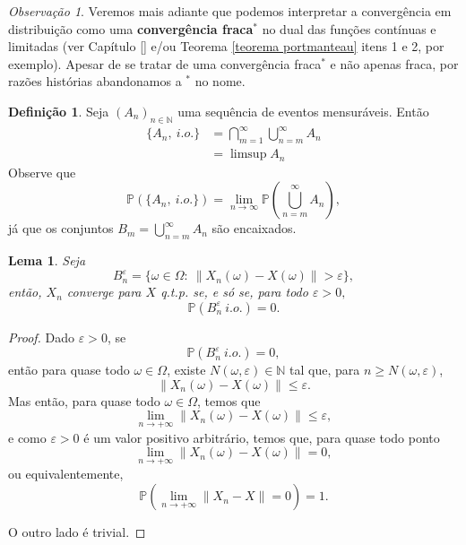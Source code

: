 \documentclass[12pt,a4paper,oneside]{book}
\newtheorem{lemma}[theorem]{Lema}
\theoremstyle{definition}
\newtheorem{definition}[theorem]{Defini\c{c}\~ao}
\theoremstyle{remark}
\newtheorem{remark}[theorem]{Observa\c{c}\~ao}
\numberwithin{equation}{section}
\newcommand{\e}{\varepsilon}
\newcommand{\N}{\mathbb{N}}
\newcommand{\pr}{\mathbb{P}}
\begin{document}
\begin{tcolorbox}[colback = yellow!60]
\begin{remark}
Veremos mais adiante que podemos interpretar a convergência em distribuição como uma \textbf{convergência fraca$^*$} no dual das funções contínuas e limitadas (ver Capítulo \ref{} e/ou Teorema \ref{teorema portmanteau} itens 1 e 2, por exemplo). Apesar de se tratar de uma convergência fraca$^*$ e não apenas fraca, por razões histórias abandonamos a $^*$ no nome.
\end{remark}
\end{tcolorbox}








\begin{definition} Seja $(A_n)_{n\in \N}$ uma sequência de eventos mensuráveis. Então
\begin{align*}
\{A_n,\ i.o.\} &= \bigcap_{m=1}^\infty \bigcup_{n=m}^\infty A_n \\
               &= \limsup A_n 
\end{align*}
Observe que
$$\pr(\{A_n,\ i.o.\}) = \lim_{n\rightarrow \infty}\pr\left(\bigcup_{n=m}^\infty A_n\right), $$
já que os conjuntos $B_m = \bigcup_{n=m}^\infty A_n$ são encaixados.
\end{definition}



\begin{tcolorbox}

\begin{lemma}

Seja 
$$B_n^\e = \{\omega\in \Omega:\ \|X_n(\omega)-X(\omega)\|>\e\}, $$
 então, $X_n$ converge para $X$ q.t.p. se, e só se, para todo $\e>0,$
$$\pr(B_n^\e\ i.o.) =0. $$
\end{lemma}
\end{tcolorbox}
\begin{proof}
Dado $\e>0$, se  
$$\pr(B_n^\e\ i.o.) =0, $$
então para quase todo $\omega\in \Omega$, existe $N(\omega,\e)\in \N$ tal que, para $n\geq N(\omega,\e)$,
$$\| X_n(\omega)-X(\omega) \|\leq \e. $$
Mas então, para quase todo $\omega\in \Omega$, temos que
$$\lim_{n\rightarrow +\infty } \| X_n(\omega)-X(\omega) \|\leq \e, $$
e como $\e>0$ é um valor positivo arbitrário, temos que, para quase todo ponto
$$\lim_{n\rightarrow +\infty } \| X_n(\omega)-X(\omega) \|=0, $$
ou equivalentemente,
$$\pr\left(\lim_{n\rightarrow +\infty} \|X_n-X\| = 0\right) = 1.$$

O outro lado é trivial.
\end{proof}
\end{document}
